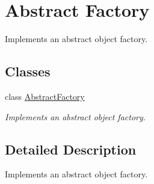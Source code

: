 \hypertarget{group__AbstractFactoryGroup}{}\section{Abstract Factory}
\label{group__AbstractFactoryGroup}


Implements an abstract object factory.  


\subsection*{Classes}
\begin{DoxyCompactItemize}
\item 
class \hyperlink{classAbstractFactory}{Abstract\+Factory}
\begin{DoxyCompactList}\small\item\em Implements an abstract object factory. \end{DoxyCompactList}\end{DoxyCompactItemize}


\subsection{Detailed Description}
Implements an abstract object factory. 

